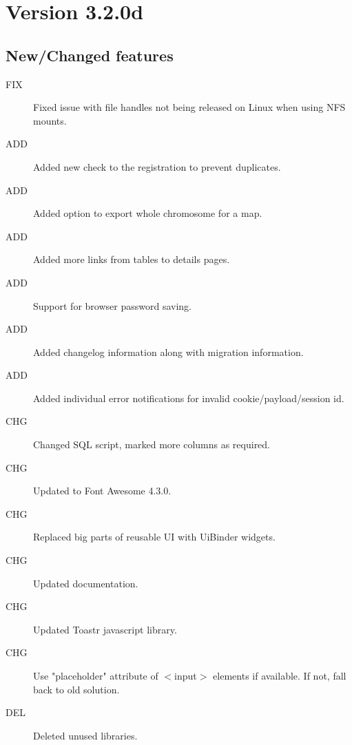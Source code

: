 \section{Version 3.2.0d}
\label{sec:3.2.0d}

\subsection{New/Changed features}
\begin{description}
	\item[FIX] Fixed issue with file handles not being released on Linux when using NFS mounts.
	\item[ADD] Added new check to the registration to prevent duplicates.
	\item[ADD] Added option to export whole chromosome for a map.
	\item[ADD] Added more links from tables to details pages.
	\item[ADD] Support for browser password saving.
	\item[ADD] Added changelog information along with migration information.
	\item[ADD] Added individual error notifications for invalid cookie/payload/session id.
	\item[CHG] Changed SQL script, marked more columns as required.
	\item[CHG] Updated to Font Awesome 4.3.0.
	\item[CHG] Replaced big parts of reusable UI with UiBinder widgets.
	\item[CHG] Updated documentation.
	\item[CHG] Updated Toastr javascript library.
	\item[CHG] Use "placeholder" attribute of $<$input$>$ elements if available. If not, fall back to old solution.
	\item[DEL] Deleted unused libraries.
\end{description}

